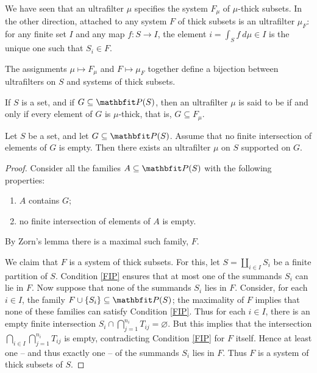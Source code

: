 \begin{cnstr}
	We have seen that an ultrafilter $ \mu $ specifies the system $ F_{\mu} $ of $ \mu $-thick subsets.
	In the other direction, attached to any system $F$ of thick subsets is an ultrafilter $\mu_F$: for any finite set $ I $ and any map $ f \colon S \to I $, the element $ i = \int_S f \ d \mu \in I $ is the unique one such that $ S_i \in F$.

	The assignments $ \mu \mapsto F_{\mu} $ and $ F \mapsto \mu_F $ together define a bijection between ultrafilters on $S$ and systems of thick subsets.
\end{cnstr}

\begin{dfn}
	If $ S $ is a set, and if $ G \subseteq \PP(S) $, then an ultrafilter $ \mu $ is said to be  if and only if every element of $G$ is $ \mu $-thick, that is, $ G \subseteq F_{\mu} $.
\end{dfn}

\begin{lem} \label{generateultrafilters}
	Let $ S $ be a set, and let $ G \subseteq \PP(S) $.
	Assume that no finite intersection of elements of $ G $ is empty.
	Then there exists an ultrafilter $ \mu $ on $ S $ supported on $ G $.
\end{lem}

\begin{proof}
	Consider all the families $ A \subseteq \PP(S) $ with the following properties:
	\begin{enumerate}[(1)]
		\item $ A $ contains $ G $;
		\item \label{FIP} no finite intersection of elements of $ A $ is empty.
	\end{enumerate}
	By Zorn's lemma there is a maximal such family, $ F $.

	We claim that $ F $ is a system of thick subsets.
	For this, let $ S = \coprod_{i \in I} S_i $ be a finite partition of $ S $.
	Condition \ref{FIP} ensures that at most one of the summands $ S_i $ can lie in $ F $.
	Now suppose that none of the summands $ S_i $ lies in $ F $.
	Consider, for each $ i \in I $, the family $ F \cup \{ S_i \} \subseteq \PP(S) $;
	the maximality of $ F $ implies that none of these families can satisfy Condition \ref{FIP}.
	Thus for each $ i \in I $, there is an empty finite intersection
	$S_i \cap \bigcap_{j = 1}^{n_i} T_{ij} = \varnothing $.
	But this implies that the intersection $ \bigcap_{i \in I}\bigcap_{j = 1}^{n_i} T_{ij} $ is empty, contradicting Condition \ref{FIP} for $ F $ itself.
	Hence at least one -- and thus exactly one -- of the summands $ S_i $ lies in $ F $.
	Thus $ F $ is a system of thick subsets of $ S $.
\end{proof}

